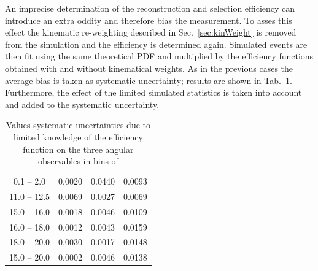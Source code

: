 An imprecise determination of the reconstruction and selection efficiency can introduce an extra oddity
and therefore bias the measurement. To asses this effect the kinematic re-weighting described in Sec.~\ref{sec:kinWeight}
is removed from the simulation and the efficiency is determined again.
Simulated events are then fit using the same theoretical PDF and multiplied by the efficiency
functions obtained with and without kinematical weights. As in the previous cases the average bias 
is taken as systematic uncertainty; results are shown in Tab.~\ref{tab:AfbeffSys}.
Furthermore, the effect of the limited simulated statistics is taken into account and 
added to the systematic uncertainty.
%
%
\begin{table}[h]
\centering
\caption{Values systematic uncertainties due to limited knowledge of the efficiency
function on the three angular observables in bins of \qsq}
\begin{tabular}{c|ccc}
 \boldmath{ \qsq [\gevgevcccc] }  &  \boldmath{ \afbl }   &  \boldmath{ \fl} &  \boldmath{ \afbh} \\ \hline
\phantom{x}0.1 -- 2.0\phantom{x}    	 & 0.0020  & 0.0440 &  0.0093\\ 
11.0 -- 12.5  					 & 0.0069  & 0.0027 &  0.0069\\
15.0 -- 16.0  					 & 0.0018  & 0.0046 &  0.0109\\
16.0 -- 18.0  					 & 0.0012  & 0.0043 &  0.0159\\
18.0 -- 20.0  					 & 0.0030  & 0.0017 &  0.0148\\
\hline
15.0 -- 20.0  					 & 0.0002  & 0.0046 &  0.0138\\
\end{tabular}
\label{tab:AfbeffSys}
\end{table}
